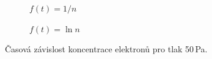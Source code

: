 \documentclass[a4paper,12pt]{article}
\begin{document}
\begin{figure}[h]
	\centering
	\begin{subfigure}[b]{.49\linewidth}
		\centering
		\caption{$f(t) = 1/n$}
	\end{subfigure}
	\begin{subfigure}[b]{.49\linewidth}
		\centering
		\caption{$f(t) = \ln n$}
	\end{subfigure}
	\caption{Časová závislost koncentrace elektronů pro tlak 50\,Pa.}
	\label{g:50Pa}
\end{figure}
\end{document}
